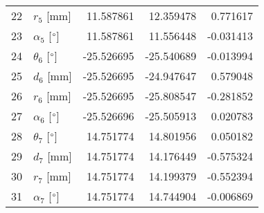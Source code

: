 \documentclass{standalone}%
\begin{document}
\begin{tabular}{llrrr}
22 &              $r_{5}$ [mm] &  11.587861 &  12.359478 &   0.771617 \\
23 &  $\alpha_{5}$ [$\degree$] &  11.587861 &  11.556448 &  -0.031413 \\
24 &  $\theta_{6}$ [$\degree$] & -25.526695 & -25.540689 &  -0.013994 \\
25 &              $d_{6}$ [mm] & -25.526695 & -24.947647 &   0.579048 \\
26 &              $r_{6}$ [mm] & -25.526695 & -25.808547 &  -0.281852 \\
27 &  $\alpha_{6}$ [$\degree$] & -25.526696 & -25.505913 &   0.020783 \\
28 &  $\theta_{7}$ [$\degree$] &  14.751774 &  14.801956 &   0.050182 \\
29 &              $d_{7}$ [mm] &  14.751774 &  14.176449 &  -0.575324 \\
30 &              $r_{7}$ [mm] &  14.751774 &  14.199379 &  -0.552394 \\
31 &  $\alpha_{7}$ [$\degree$] &  14.751774 &  14.744904 &  -0.006869 \\
\bottomrule
\end{tabular}
%
\end{document}
